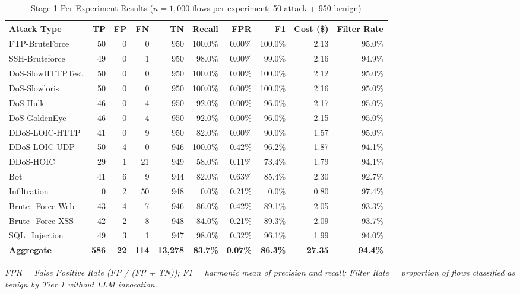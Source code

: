 \begin{table}[H]
\centering
\caption{Stage 1 Per-Experiment Results ($n = 1{,}000$ flows per experiment; 50 attack + 950 benign)}
\label{tab:stage1-results}
\scriptsize
\begin{tabularx}{\textwidth}{@{}l r r r r r r r r r@{}}
\toprule
Attack Type & TP & FP & FN & TN & Recall & FPR & F1 & Cost (\$) & Filter Rate \\
\midrule
FTP-BruteForce & 50 & 0 & 0 & 950 & 100.0\% & 0.00\% & 100.0\% & 2.13 & 95.0\% \\
SSH-Bruteforce & 49 & 0 & 1 & 950 & 98.0\% & 0.00\% & 99.0\% & 2.16 & 94.9\% \\
DoS-SlowHTTPTest & 50 & 0 & 0 & 950 & 100.0\% & 0.00\% & 100.0\% & 2.12 & 95.0\% \\
DoS-Slowloris & 50 & 0 & 0 & 950 & 100.0\% & 0.00\% & 100.0\% & 2.16 & 95.0\% \\
DoS-Hulk & 46 & 0 & 4 & 950 & 92.0\% & 0.00\% & 96.0\% & 2.17 & 95.0\% \\
DoS-GoldenEye & 46 & 0 & 4 & 950 & 92.0\% & 0.00\% & 96.0\% & 2.15 & 95.0\% \\
DDoS-LOIC-HTTP & 41 & 0 & 9 & 950 & 82.0\% & 0.00\% & 90.0\% & 1.57 & 95.0\% \\
DDoS-LOIC-UDP & 50 & 4 & 0 & 946 & 100.0\% & 0.42\% & 96.2\% & 1.87 & 94.1\% \\
DDoS-HOIC & 29 & 1 & 21 & 949 & 58.0\% & 0.11\% & 73.4\% & 1.79 & 94.1\% \\
Bot & 41 & 6 & 9 & 944 & 82.0\% & 0.63\% & 85.4\% & 2.30 & 92.7\% \\
Infiltration & 0 & 2 & 50 & 948 & 0.0\% & 0.21\% & 0.0\% & 0.80 & 97.4\% \\
Brute\_Force-Web & 43 & 4 & 7 & 946 & 86.0\% & 0.42\% & 89.1\% & 2.05 & 93.3\% \\
Brute\_Force-XSS & 42 & 2 & 8 & 948 & 84.0\% & 0.21\% & 89.3\% & 2.09 & 93.7\% \\
SQL\_Injection & 49 & 3 & 1 & 947 & 98.0\% & 0.32\% & 96.1\% & 1.99 & 94.0\% \\
\midrule
\textbf{Aggregate} & \textbf{586} & \textbf{22} & \textbf{114} & \textbf{13,278} & \textbf{83.7\%} & \textbf{0.07\%} & \textbf{86.3\%} & \textbf{27.35} & \textbf{94.4\%} \\
\bottomrule
\end{tabularx}

\vspace{0.5em}
\noindent\textit{FPR = False Positive Rate (FP / (FP + TN)); F1 = harmonic mean of precision and recall; Filter Rate = proportion of flows classified as benign by Tier 1 without LLM invocation.}
\end{table}

